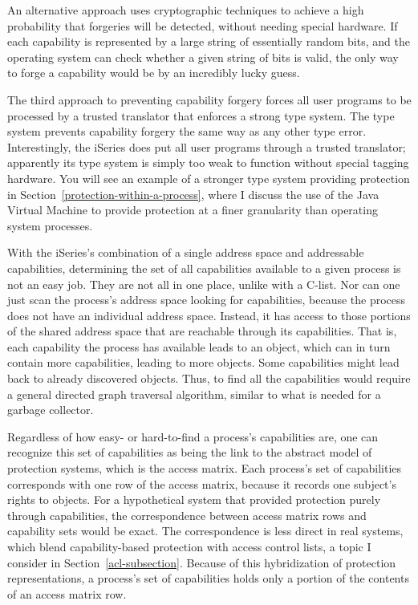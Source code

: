 An alternative approach uses cryptographic techniques to achieve a
high probability that forgeries will be detected, without needing
special hardware.  If each capability is represented by a large string
of essentially random bits, and the operating system can check whether
a given string of bits is valid, the only way to forge a capability
would be by an incredibly lucky guess.

The third approach to preventing capability forgery forces all user
programs to be processed by a trusted translator that enforces a
strong type system.  The type system prevents capability forgery the
same way as any other type error.  Interestingly,
the iSeries does put all user programs
through a trusted translator; apparently its type system is simply too
weak to function without special tagging hardware.  You will see an
example of a stronger type system providing protection in
Section~\ref{protection-within-a-process}, where I discuss the use of
the Java Virtual Machine to provide protection at a finer granularity
than operating system processes.

With the iSeries's combination of a single address space and
addressable capabilities, determining the set of all capabilities
available to a given process is not an easy job.  They are not all in
one place, unlike with a C-list.  Nor can one just scan the process's
address space looking for capabilities, because the process does not
have an individual address space.  Instead, it has access to those
portions of the shared address space that are reachable through its
capabilities.  That is, each capability the process has available leads to an object, which can in turn
contain more capabilities, leading to more objects.  Some capabilities
might lead back to already discovered objects.  Thus, to find all the
capabilities would require a general directed graph traversal
algorithm, similar to what is needed for a garbage collector.

Regardless of how easy- or hard-to-find a process's capabilities are,
one can recognize this set of capabilities as being the link to the
abstract model of protection systems, which is the access matrix.  Each
process's set of capabilities corresponds with one row of the access
matrix, because it records one subject's rights to objects.  For a
hypothetical system that provided protection purely through
capabilities, the correspondence between access matrix rows and
capability sets would be exact.  The correspondence is less direct in
real systems, which blend capability-based protection with access
control lists, a topic I consider in Section~\ref{acl-subsection}.  Because of
this hybridization of protection representations, a process's set of
capabilities holds only a portion of the contents of an access matrix
row.

